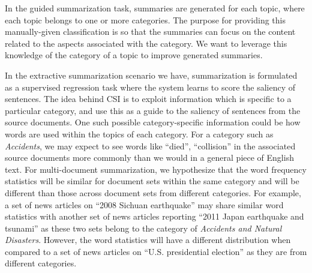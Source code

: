 \label{csi_motivation}

In the guided summarization task, summaries are generated for each topic, where each topic belongs to one or more categories. The purpose for providing this manually-given classification is so that the summaries can focus on the content related to the aspects associated with the category. We want to leverage this knowledge of the category of a topic to improve generated summaries. 

In the extractive summarization scenario we have, 
summarization is formulated as a supervised regression task where the system learns to score the saliency of sentences.
The idea behind CSI is to exploit information which is specific to a particular category, and use this as a guide to the saliency of sentences from the source documents.  One such possible category-specific information could be how words are used within the topics of each category. For a category such as \emph{Accidents}, we may expect to see words like ``died'', ``collision'' in the associated source documents more commonly than we would in a general piece of English text. 
For multi-document summarization, we hypothesize that the word frequency statistics will be similar for document sets within the same category and will be different than those across document sets from different categories.
For example, a set of news articles on ``2008 Sichuan earthquake'' may share similar word statistics with another set of news articles reporting ``2011 Japan earthquake and tsunami'' as these two sets belong to the category of \emph{Accidents and Natural Disasters}. However, the word statistics will have a different distribution when compared to a set of news articles on ``U.S. presidential election'' as they are from different categories.


